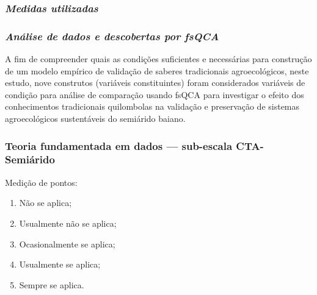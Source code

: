 \subsubsection*{\textit{Medidas utilizadas}}




\subsubsection*{\textit{Análise de dados e descobertas por fsQCA}}

A fim de compreender quais as condições suficientes e necessárias para construção de um modelo empírico de validação de saberes tradicionais agroecológicos, neste estudo, nove construtos (variáveis constituintes) foram considerados variáveis de condição para análise de comparação usando fsQCA para investigar o efeito dos conhecimentos tradicionais quilombolas na validação e preservação de sistemas agroecológicos sustentáveis do semiárido baiano.


\subsubsection*{Teoria fundamentada em dados — sub-escala CTA-Semiárido}

Medição de pontos:
\begin{enumerate}
\item Não se aplica;
\item Usualmente não se aplica;
\item Ocasionalmente se aplica;
\item Usualmente se aplica;
\item Sempre se aplica.
\end{enumerate}

